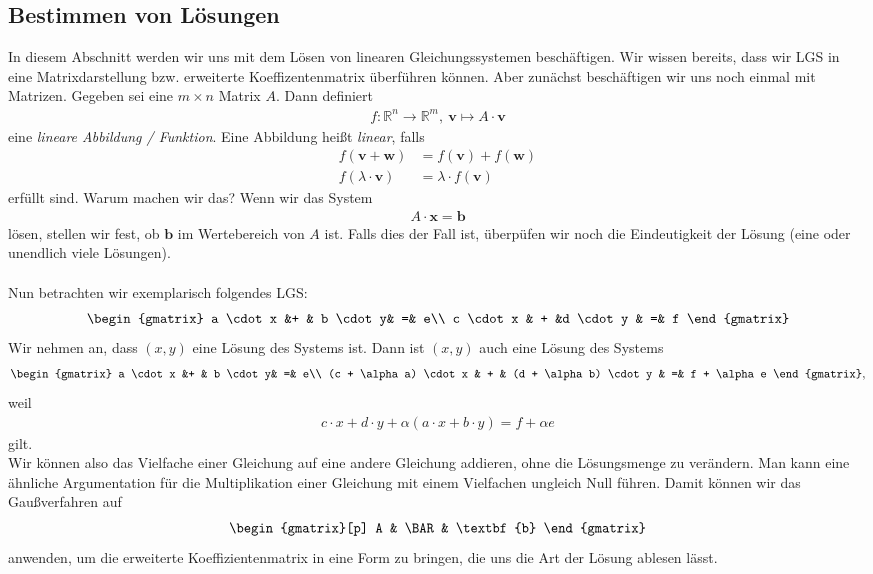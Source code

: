 \subsection{Bestimmen von Lösungen}
In diesem Abschnitt werden wir uns mit dem Lösen von linearen Gleichungssystemen beschäftigen.
Wir wissen bereits, dass wir LGS in eine Matrixdarstellung bzw. erweiterte Koeffizentenmatrix überführen können.
Aber zunächst beschäftigen wir uns noch einmal mit Matrizen.
Gegeben sei eine $m \times n $ Matrix $A$. Dann definiert
\begin{align*}
f : \mathbb{R}^n \to \mathbb{R}^m, \ \textbf{v} \mapsto A \cdot \textbf{v}
\end{align*}
eine \textit{lineare Abbildung / Funktion}.
Eine Abbildung heißt \textit{linear}, falls
\begin{align*}
f( \textbf{v} + \textbf{w}) &= f(\textbf{v}) + f(\textbf{w})\\
f( \lambda \cdot \textbf{v} ) &= \lambda \cdot f(\textbf{v})
\end{align*}
erfüllt sind.
Warum machen wir das?
Wenn wir das System
\begin{align*}
A \cdot \textbf{x} = \textbf{b}
\end{align*}
lösen, stellen wir fest, ob $\textbf{b}$ im Wertebereich von $A$ ist.
Falls dies der Fall ist, überpüfen wir noch die Eindeutigkeit der Lösung (eine oder unendlich viele Lösungen).\\ \\
Nun betrachten wir exemplarisch folgendes LGS:
\begin{align*}
\begin{gmatrix}
a \cdot x	&+ & b \cdot y& =& e\\
c \cdot x & +  &d \cdot y & =& f
\end{gmatrix}
\end{align*}
Wir nehmen an, dass $(x,y)$ eine Lösung des Systems ist.
Dann ist $(x,y)$ auch eine Lösung des Systems
\begin{align*}
\begin{gmatrix}
a \cdot x	&+ & b \cdot y& =& e\\
(c + \alpha a) \cdot x & +  & (d + \alpha b) \cdot y & =& f + \alpha e
\end{gmatrix},
\end{align*}
weil
\begin{align*}
c\cdot x + d \cdot y + \alpha( a \cdot x + b \cdot y) = f + \alpha e
\end{align*}
gilt.\\
Wir können also das Vielfache einer Gleichung auf eine andere Gleichung addieren, ohne die Lösungsmenge zu verändern.
Man kann eine ähnliche Argumentation für die Multiplikation einer Gleichung mit einem Vielfachen ungleich Null führen.
Damit können wir das Gaußverfahren auf 
\begin{align*}
\begin{gmatrix}[p]
A & \BAR & \textbf{b}
\end{gmatrix}
\end{align*}
anwenden, um die erweiterte Koeffizientenmatrix in eine Form zu bringen, die uns die Art der Lösung ablesen lässt.

